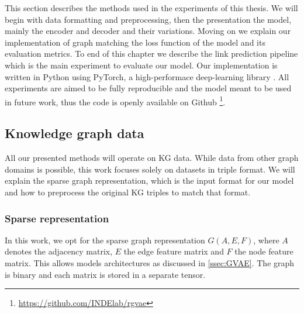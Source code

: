 This section describes the methods used in the experiments of this thesis. We will begin with data formatting and preprocessing, then the presentation the model, mainly the encoder and decoder and their variations. Moving on we explain our implementation of graph matching the loss function of the model and its evaluation metrics. To end of this chapter we describe the link prediction pipeline which is the main experiment to evaluate our model. Our implementation is written in Python using PyTorch, a high-performace deep-learning library \cite{pytorch}. All experiments are aimed to be fully reproducible and the model meant to be used in future work, thus the code is openly available on Github \footnote{\url{https://github.com/INDElab/rgvae}}.

\subsection{Knowledge graph data}
All our presented methods will operate on KG data. While data from other graph domains is possible, this work focuses solely on datasets in triple format. We will explain the sparse graph representation, which is the input format for our model and how to preprocess the original KG triples to match that format.

\subsubsection{Sparse representation}


In this work, we opt for the sparse graph representation $G(A,E,F)$, where $A$ denotes the adjacency matrix, $E$ the edge feature matrix and $F$ the node feature matrix. This allows models architectures as discussed in \ref{ssec:GVAE}. The graph is binary and each matrix is stored in a separate tensor.

